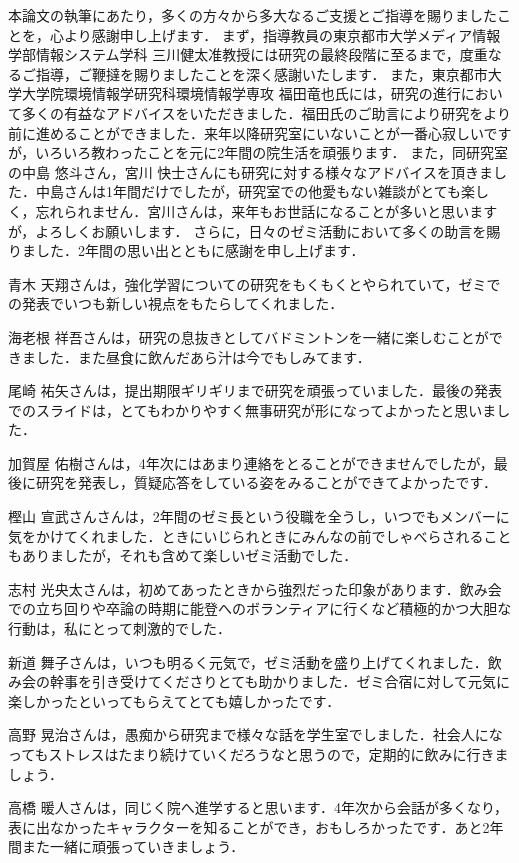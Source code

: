 本論文の執筆にあたり，多くの方々から多大なるご支援とご指導を賜りましたことを，心より感謝申し上げます．
まず，指導教員の東京都市大学メディア情報学部情報システム学科 三川健太准教授には研究の最終段階に至るまで，度重なるご指導，ご鞭撻を賜りましたことを深く感謝いたします．
また，東京都市大学大学院環境情報学研究科環境情報学専攻 福田竜也氏には，研究の進行において多くの有益なアドバイスをいただきました．福田氏のご助言により研究をより前に進めることができました．来年以降研究室にいないことが一番心寂しいですが，いろいろ教わったことを元に2年間の院生活を頑張ります．
また，同研究室の中島 悠斗さん，宮川 快士さんにも研究に対する様々なアドバイスを頂きました．中島さんは1年間だけでしたが，研究室での他愛もない雑談がとても楽しく，忘れられません．宮川さんは，来年もお世話になることが多いと思いますが，よろしくお願いします．
さらに，日々のゼミ活動において多くの助言を賜りました．2年間の思い出とともに感謝を申し上げます．

青木 天翔さんは，強化学習についての研究をもくもくとやられていて，ゼミでの発表でいつも新しい視点をもたらしてくれました．

海老根 祥吾さんは，研究の息抜きとしてバドミントンを一緒に楽しむことができました．また昼食に飲んだあら汁は今でもしみてます．

尾崎 祐矢さんは，提出期限ギリギリまで研究を頑張っていました．最後の発表でのスライドは，とてもわかりやすく無事研究が形になってよかったと思いました．

加賀屋 佑樹さんは，4年次にはあまり連絡をとることができませんでしたが，最後に研究を発表し，質疑応答をしている姿をみることができてよかったです．

樫山 宣武さんさんは，2年間のゼミ長という役職を全うし，いつでもメンバーに気をかけてくれました．ときにいじられときにみんなの前でしゃべらされることもありましたが，それも含めて楽しいゼミ活動でした．

志村 光央太さんは，初めてあったときから強烈だった印象があります．飲み会での立ち回りや卒論の時期に能登へのボランティアに行くなど積極的かつ大胆な行動は，私にとって刺激的でした．

新道 舞子さんは，いつも明るく元気で，ゼミ活動を盛り上げてくれました．飲み会の幹事を引き受けてくださりとても助かりました．ゼミ合宿に対して元気に楽しかったといってもらえてとても嬉しかったです．

高野 晃治さんは，愚痴から研究まで様々な話を学生室でしました．社会人になってもストレスはたまり続けていくだろうなと思うので，定期的に飲みに行きましょう．

高橋 暖人さんは，同じく院へ進学すると思います．4年次から会話が多くなり，表に出なかったキャラクターを知ることができ，おもしろかったです．あと2年間また一緒に頑張っていきましょう．

